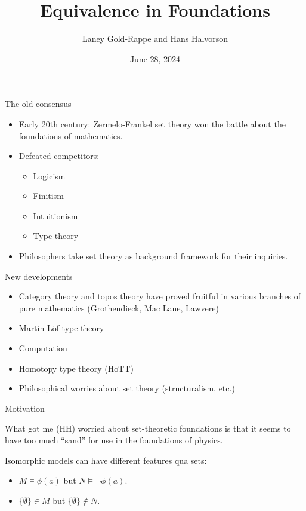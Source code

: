 \documentclass[ignorenonframetext,fleqn]{beamer}
\title{Equivalence in Foundations}
\author{Laney Gold-Rappe and Hans Halvorson}
\date{June 28, 2024}
\newcommand{\2}{\mathcal}
\begin{document}
\frame{\titlepage}



\begin{frame}{The old consensus}

  \begin{itemize}
  \item Early 20th century: Zermelo-Frankel set theory won the battle
    about the foundations of mathematics.
  \item Defeated competitors:
    \begin{itemize}
    \item Logicism
    \item Finitism
    \item Intuitionism
    \item Type theory
    \end{itemize}
  \item Philosophers take set theory as background framework for their
    inquiries. 
  \end{itemize}

\end{frame}


\begin{frame}{New developments}

  \begin{itemize}
  \item Category theory and topos theory have proved fruitful in
    various branches of pure mathematics (Grothendieck, Mac Lane,
    Lawvere)
  \item Martin-L{\"o}f type theory
  \item Computation
  \item Homotopy type theory (HoTT)
  \item Philosophical worries about set theory (structuralism, etc.)
  \end{itemize}

\end{frame}

\begin{frame}{Motivation}

  What got me (HH) worried about set-theoretic foundations is that it
  seems to have too much ``sand'' for use in the foundations of
  physics.

  \bigskip Isomorphic models can have different features qua sets:
  \begin{itemize}
  \item $M\vDash \phi (a)$ but $N\vDash \neg \phi (a)$.
  \item $\{ \emptyset \}\in M$ but $\{ \emptyset \}\not\in N$.
  \end{itemize}

\end{frame}
\end{document}

